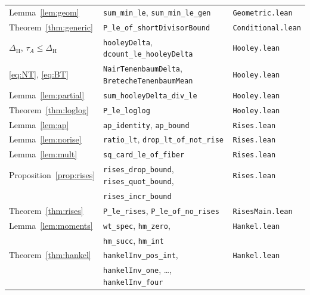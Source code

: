 \documentclass[11pt]{amsart}
\theoremstyle{definition}
\theoremstyle{remark}
\newcommand{\lean}[1]{\texttt{#1}}
\begin{document}
\begin{center}
\begin{tabular}{@{}lll@{}}
Lemma~\ref{lem:geom} & \lean{sum\_min\_le}, \lean{sum\_min\_le\_gen} & \lean{Geometric.lean}\\
Theorem~\ref{thm:generic} & \lean{P\_le\_of\_shortDivisorBound} & \lean{Conditional.lean}\\
$\Delta_{\mathrm H}$, $\tau_A\le\Delta_{\mathrm H}$ & \lean{hooleyDelta}, \lean{dcount\_le\_hooleyDelta} & \lean{Hooley.lean}\\
\eqref{eq:NT}, \eqref{eq:BT} & \lean{NairTenenbaumDelta}, \lean{BretecheTenenbaumMean} & \lean{Hooley.lean}\\
Lemma~\ref{lem:partial} & \lean{sum\_hooleyDelta\_div\_le} & \lean{Hooley.lean}\\
Theorem~\ref{thm:loglog} & \lean{P\_le\_loglog} & \lean{Hooley.lean}\\
Lemma~\ref{lem:ap} & \lean{ap\_identity}, \lean{ap\_bound} & \lean{Rises.lean}\\
Lemma~\ref{lem:norise} & \lean{ratio\_lt}, \lean{drop\_lt\_of\_not\_rise} & \lean{Rises.lean}\\
Lemma~\ref{lem:mult} & \lean{sq\_card\_le\_of\_fiber} & \lean{Rises.lean}\\
Proposition~\ref{prop:rises} & \lean{rises\_drop\_bound}, \lean{rises\_quot\_bound}, & \lean{Rises.lean}\\
 & \lean{rises\_incr\_bound} & \\
Theorem~\ref{thm:rises} & \lean{P\_le\_rises}, \lean{P\_le\_of\_no\_rises} & \lean{RisesMain.lean}\\
Lemma~\ref{lem:moments} & \lean{wt\_spec}, \lean{hm\_zero}, & \lean{Hankel.lean}\\
 & \lean{hm\_succ}, \lean{hm\_int} & \\
Theorem~\ref{thm:hankel} & \lean{hankelInv\_pos\_int}, & \lean{Hankel.lean}\\
 & \lean{hankelInv\_one}, \dots, \lean{hankelInv\_four} & \\
\bottomrule
\end{tabular}
\end{center}
\end{document}
